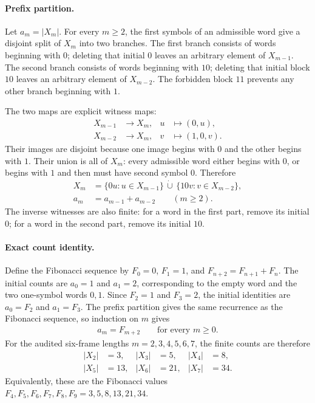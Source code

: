 \paragraph{Prefix partition.}
Let $a_m=|X_m|$. For every $m\geq 2$, the first symbols of an admissible word give a disjoint split of $X_m$ into two branches. The first branch consists of words beginning with $0$; deleting that initial $0$ leaves an arbitrary element of $X_{m-1}$. The second branch consists of words beginning with $10$; deleting that initial block $10$ leaves an arbitrary element of $X_{m-2}$. The forbidden block $11$ prevents any other branch beginning with $1$.

The two maps are explicit witness maps:
$$
\begin{aligned}
 X_{m-1} &\longrightarrow X_m, & u &\longmapsto (0,u),\\
 X_{m-2} &\longrightarrow X_m, & v &\longmapsto (1,0,v).
\end{aligned}
$$
Their images are disjoint because one image begins with $0$ and the other begins with $1$. Their union is all of $X_m$: every admissible word either begins with $0$, or begins with $1$ and then must have second symbol $0$. Therefore
$$
\begin{aligned}
 X_m &= \{0u:u\in X_{m-1}\}\,\dot\cup\,\{10v:v\in X_{m-2}\},\\
 a_m &= a_{m-1}+a_{m-2}\qquad (m\geq 2).
\end{aligned}
$$
The inverse witnesses are also finite: for a word in the first part, remove its initial $0$; for a word in the second part, remove its initial $10$.

\paragraph{Exact count identity.}
Define the Fibonacci sequence by $F_0=0$, $F_1=1$, and $F_{n+2}=F_{n+1}+F_n$. The initial counts are $a_0=1$ and $a_1=2$, corresponding to the empty word and the two one-symbol words $0,1$. Since $F_2=1$ and $F_3=2$, the initial identities are $a_0=F_2$ and $a_1=F_3$. The prefix partition gives the same recurrence as the Fibonacci sequence, so induction on $m$ gives
$$
\begin{aligned}
 a_m=F_{m+2}\qquad\text{for every }m\geq 0.
\end{aligned}
$$
For the audited six-frame lengths $m=2,3,4,5,6,7$, the finite counts are therefore
$$
\begin{aligned}
 |X_2|&=3, & |X_3|&=5, & |X_4|&=8,\\
 |X_5|&=13, & |X_6|&=21, & |X_7|&=34.
\end{aligned}
$$
Equivalently, these are the Fibonacci values $F_4,F_5,F_6,F_7,F_8,F_9=3,5,8,13,21,34$.

